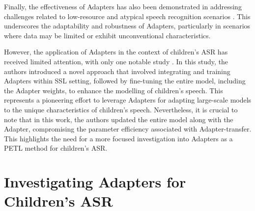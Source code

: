 
Finally, the effectiveness of Adapters has also been demonstrated in addressing challenges related to low-resource and atypical speech recognition scenarios \cite{tomanek2021residual}. This underscores the adaptability and robustness of Adapters, particularly in scenarios where data may be limited or exhibit unconventional characteristics. 

However, the application of Adapters in the context of children's \ac{ASR} has received limited attention, with only one notable study \cite{fan2022draft}. In this study, the authors introduced a novel approach that involved integrating and training Adapters within \ac{SSL} setting, followed by fine-tuning the entire model, including the Adapter weights,  to enhance the modelling of children's speech. This represents a pioneering effort to leverage Adapters for adapting large-scale models to the unique characteristics of children's speech. Nevertheless, it is crucial to note that in this work, the authors updated the entire model along with the Adapter, compromising the parameter efficiency associated with Adapter-transfer. This highlights the need for a more focused investigation into Adapters as a \ac{PETL} method for children's \ac{ASR}. 

\section{Investigating Adapters for Children's ASR}

